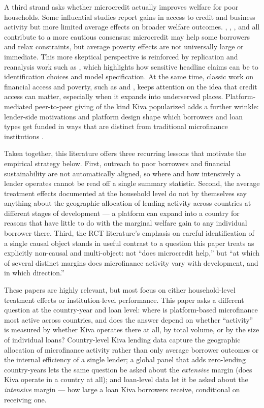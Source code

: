 \documentclass[12pt]{article}
\begin{document}
A third strand asks whether microcredit actually improves welfare for poor households. Some
influential studies report gains in access to credit and business activity but more limited average
effects on broader welfare outcomes. \citet{banerjee2015}, \citet{angelucci2015},
\citet{tarozzi2015}, and \citet{karlanzinman2011} all contribute to a more cautious consensus:
microcredit may help some borrowers and relax constraints, but average poverty effects are not
universally large or immediate. This more skeptical perspective is reinforced by replication and
reanalysis work such as \citet{roodman2014}, which highlights how sensitive headline claims can be to
identification choices and model specification. At the same time, classic work on financial access
and poverty, such as \citet{pitt1998} and \citet{burgess2005}, keeps attention on the idea that
credit access can matter, especially when it expands into underserved places. Platform-mediated
peer-to-peer giving of the kind Kiva popularized adds a further wrinkle: lender-side motivations and
platform design shape which borrowers and loan types get funded in ways that are distinct from
traditional microfinance institutions \citep{galak2011}.

Taken together, this literature offers three recurring lessons that motivate the empirical strategy
below. First, outreach to poor borrowers and financial sustainability are not automatically aligned, so
where and how intensively a lender operates cannot be read off a single summary statistic. Second, the
average treatment effects documented at the household level do not by themselves say anything about
the geographic allocation of lending activity across countries at different stages of development ---
a platform can expand into a country for reasons that have little to do with the marginal welfare gain
to any individual borrower there. Third, the RCT literature's emphasis on careful identification of a
single causal object stands in useful contrast to a question this paper treats as explicitly
non-causal and multi-object: not ``does microcredit help,'' but ``at which of several distinct margins
does microfinance activity vary with development, and in which direction.''

These papers are highly relevant, but most focus on either household-level treatment effects or
institution-level performance. This paper asks a different question at the country-year and loan
level: where is platform-based microfinance most active across countries, and does the answer depend
on whether ``activity'' is measured by whether Kiva operates there at all, by total volume, or by the
size of individual loans? Country-level Kiva lending data capture the geographic allocation of
microfinance activity rather than only average borrower outcomes or the internal efficiency of a
single lender; a global panel that adds zero-lending country-years lets the same question be asked
about the \emph{extensive} margin (does Kiva operate in a country at all); and loan-level data let it
be asked about the \emph{intensive} margin --- how large a loan Kiva borrowers receive, conditional on
receiving one.
\end{document}
